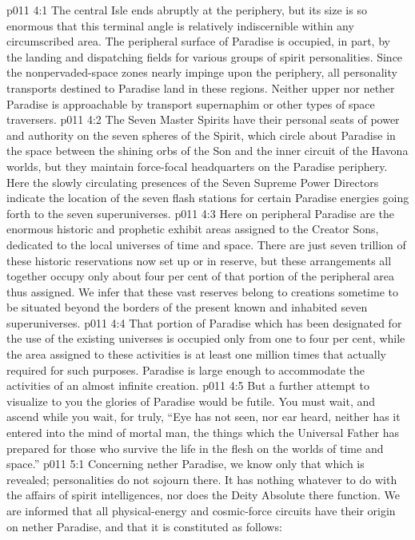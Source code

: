 \vs p011 4:1 The central Isle ends abruptly at the periphery, but its size is so enormous that this terminal angle is relatively indiscernible within any circumscribed area. The peripheral surface of Paradise is occupied, in part, by the landing and dispatching fields for various groups of spirit personalities. Since the nonpervaded\hyp{}space zones nearly impinge upon the periphery, all personality transports destined to Paradise land in these regions. Neither upper nor nether Paradise is approachable by transport supernaphim or other types of space traversers.
\vs p011 4:2 The Seven Master Spirits have their personal seats of power and authority on the seven spheres of the Spirit, which circle about Paradise in the space between the shining orbs of the Son and the inner circuit of the Havona worlds, but they maintain force\hyp{}focal headquarters on the Paradise periphery. Here the slowly circulating presences of the Seven Supreme Power Directors indicate the location of the seven flash stations for certain Paradise energies going forth to the seven superuniverses.
\vs p011 4:3 Here on peripheral Paradise are the enormous historic and prophetic exhibit areas assigned to the Creator Sons, dedicated to the local universes of time and space. There are just seven trillion of these historic reservations now set up or in reserve, but these arrangements all together occupy only about four per cent of that portion of the peripheral area thus assigned. We infer that these vast reserves belong to creations sometime to be situated beyond the borders of the present known and inhabited seven superuniverses.
\vs p011 4:4 That portion of Paradise which has been designated for the use of the existing universes is occupied only from one to four per cent, while the area assigned to these activities is at least one million times that actually required for such purposes. Paradise is large enough to accommodate the activities of an almost infinite creation.
\vs p011 4:5 But a further attempt to visualize to you the glories of Paradise would be futile. You must wait, and ascend while you wait, for truly, “Eye has not seen, nor ear heard, neither has it entered into the mind of mortal man, the things which the Universal Father has prepared for those who survive the life in the flesh on the worlds of time and space.”\plusone
{}
\vs p011 5:1 Concerning nether Paradise, we know only that which is revealed; personalities do not sojourn there. It has nothing whatever to do with the affairs of spirit intelligences, nor does the Deity Absolute there function. We are informed that all physical\hyp{}energy and cosmic\hyp{}force circuits have their origin on nether Paradise, and that it is constituted as follows:
